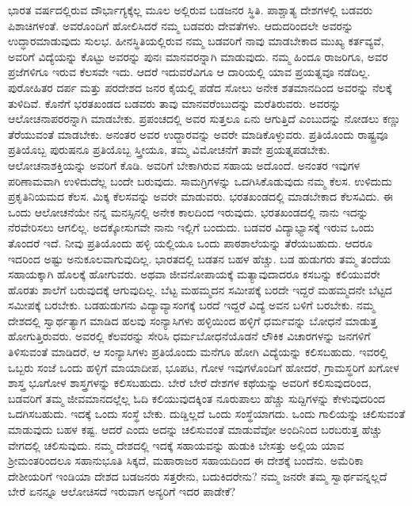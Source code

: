 ಭಾರತ ವರ್ಷದಲ್ಲಿರುವ ದೌರ್ಭಾಗ್ಯಕ್ಕೆಲ್ಲ ಮೂಲ ಅಲ್ಲಿರುವ ಬಡಜನರ ಸ್ಥಿತಿ. ಪಾಶ್ಚಾತ್ಯ ದೇಶಗಳಲ್ಲಿ ಬಡವರು ಪಿಶಾಚಿಗಳಂತೆ. ಅವರೊಂದಿಗೆ ಹೋಲಿಸಿದರೆ ನಮ್ಮ ಬಡವರು ದೇವತೆಗಳು. ಆದುದರಿಂದಲೇ ಅವರನ್ನು ಉದ್ಧಾರಮಾಡುವುದು ಸುಲಭ. ಹೀನಸ್ಥಿತಿಯಲ್ಲಿರುವ ನಮ್ಮ ಬಡವರಿಗೆ ನಾವು ಮಾಡಬೇಕಾದ ಮುಖ್ಯ ಕರ್ತವ್ಯವೆ, ಅವರಿಗೆ ವಿದ್ಯೆಯನ್ನು ಕೊಟ್ಟು ಅವರನ್ನು ಪುನಃ ಮಾನವರನ್ನಾಗಿ ಮಾಡುವುದು. ನಮ್ಮ ಹಿಂದೂ ರಾಜರಿಗೂ, ಅವರ ಪ್ರಜೆಗಳಿಗೂ ಇರುವ ಕೆಲಸವೇ ಇದು. ಆದರೆ ಇದುವರೆವಿಗೂ ಆ ದಾರಿಯಲ್ಲಿ ಯಾವ ಪ್ರಯತ್ನವೂ ನಡೆದಿಲ್ಲ. ಪುರೋಹಿತರ ದರ್ಪ ಮತ್ತು ಪರದೇಶದ ಜನರ ಕೈಯಲ್ಲಿ ಪಡೆದ ಸೋಲು ಅನೇಕ ಶತಮಾನದಿಂದ ಅವರನ್ನು ನೆಲಕ್ಕೆ ತುಳಿದಿವೆ. ಕೊನೆಗೆ ಭರತಖಂಡದ ಬಡವರು ತಾವು ಮಾನವರೆಂಬುದನ್ನು ಮರೆತಿರುವರು. ಅವರನ್ನು ಆಲೋಚನಾಪರರನ್ನಾಗಿ ಮಾಡಬೇಕು. ಪ್ರಪಂಚದಲ್ಲಿ ಅವರ ಸುತ್ತಲೂ ಏನು ಆಗುತ್ತಿದೆ ಎಂಬುದನ್ನು ನೋಡಲು ಕಣ್ಣು ತೆರೆಯುವಂತೆ ಮಾಡಬೇಕು. ಅನಂತರ ಅವರ ಉದ್ದಾರವನ್ನು ಅವರೇ ಮಾಡಿಕೊಳ್ಳುವರು. ಪ್ರತಿಯೊಂದು ರಾಷ್ಟ್ರವೂ ಪ್ರತಿಯೊಬ್ಬ ಪುರುಷನೂ ಪ್ರತಿಯೊಬ್ಬ ಸ್ತ್ರೀಯೂ, ತಮ್ಮ ವಿಮೋಚನೆಗೆ ತಾವೇ ಪ್ರಯತ್ನಪಡಬೇಕು. ಆಲೋಚನಾಶಕ್ತಿಯನ್ನು ಅವರಿಗೆ ಕೊಡಿ. ಅವರಿಗೆ ಬೇಕಾಗಿರುವ ಸಹಾಯ ಅದೊಂದೆ. ಅನಂತರ ಇವುಗಳ ಪರಿಣಾಮವಾಗಿ ಉಳಿದುದೆಲ್ಲ ಬಂದೇ ಬರುವುದು. ಸಾಮಗ್ರಿಗಳನ್ನು ಒದಗಿಸಿಕೊಡುವುದು ನಮ್ಮ ಕೆಲಸ. ಉಳಿದುದು ಪ್ರಕೃತಿನಿಯಮದ ಕೆಲಸ. ಮಿಕ್ಕ ಕೆಲಸವನ್ನು ಅವರೇ ಮಾಡುವರು. ಭರತಖಂಡದಲ್ಲಿ ಮಾಡಬೇಕಾದ ಕೆಲಸವಿದು. ಈ ಒಂದು ಆಲೋಚನೆಯೇ ನನ್ನ ಮನಸ್ಸಿನಲ್ಲಿ ಅನೇಕ ಕಾಲದಿಂದ ಇರುವುದು. ಭರತಖಂಡದಲ್ಲಿ ನಾನು ಇದನ್ನು ನೆರವೇರಿಸಲು ಆಗಲಿಲ್ಲ. ಅದಕ್ಕೋಸುಗವೇ ನಾನು ಇಲ್ಲಿಗೆ ಬಂದುದು. ಬಡವರ ವಿದ್ಯಾಭ್ಯಾಸಕ್ಕೆ ಇರುವ ಒಂದು ತೊಂದರೆ ಇದೆ. ನೀವು ಪ್ರತಿಯೊಂದು ಹಳ್ಳಿ ಯಲ್ಲಿಯೂ ಒಂದು ಪಾಠಶಾಲೆಯನ್ನು ತೆರೆಯಬಹುದು. ಆದರೂ ಇದರಿಂದ ಅಷ್ಟು ಅನುಕೂಲವಾಗುವುದಿಲ್ಲ. ಭಾರತದಲ್ಲಿ ಬಡತನ ಬಹಳ ಹೆಚ್ಚು. ಬಡ ಹುಡುಗರು ತಮ್ಮ ತಂದೆಯ ಸಹಾಯಕ್ಕಾಗಿ ಹೊಲಕ್ಕೆ ಹೋಗುವರು. ಅಥವಾ ಜೀವನೋಪಾಯಕ್ಕೆ ಮತ್ಯಾವುದಾದರೂ ಕಸಬನ್ನು ಕಲಿಯುವರೇ ಹೊರತು ಶಾಲೆಗೆ ಬರುವುದಕ್ಕೆ ಆಗುವುದಿಲ್ಲ. ಬೆಟ್ಟ ಮಹಮ್ಮದನ ಸಮೀಪಕ್ಕೆ ಬರದೇ ಇದ್ದರೆ ಮಹಮ್ಮದನೇ ಬೆಟ್ಟದ ಸಮೀಪಕ್ಕೆ ಬರಬೇಕು. ಬಡಹುಡುಗನು ವಿದ್ಯಾವ್ಯಾಸಂಗಕ್ಕೆ ಬರದೆ ಇದ್ದರೆ ವಿದ್ಯೆ ಅವನ ಬಳಿಗೆ ಬರಬೇಕು. ನಮ್ಮ ದೇಶದಲ್ಲಿ ಸ್ವಾರ್ಥತ್ಯಾಗ ಮಾಡಿದ ಹಲವು ಸಂನ್ಯಾಸಿಗಳು ಹಳ್ಳಿಯಿಂದ ಹಳ್ಳಿಗೆ ಧರ್ಮವನ್ನು ಬೋಧನೆ ಮಾಡುತ್ತ ಹೋಗುತ್ತಿರುವರು. ಅವರಲ್ಲಿ ಕೆಲವರನ್ನು ಸೇರಿಸಿ ಧರ್ಮಬೋಧನೆಯೊಡನೆ ಲೌಕಿಕ ವಿಚಾರಗಳನ್ನು ಜನಗಳಿಗೆ ತಿಳಿಸುವಂತೆ ಮಾಡಿದರೆ, ಆ ಸಂನ್ಯಾಸಿಗಳು ಪ್ರತಿಯೊಂದು ಮನೆಗೂ ಹೋಗಿ ವಿದ್ಯೆಯನ್ನು ಕಲಿಸಬಹುದು. ಇವರಲ್ಲಿ ಒಬ್ಬರು ಸಂಜೆ ಒಂದು ಹಳ್ಳಿಗೆ ಮಾಯಾದೀಪ, ಭೂಪಟ, ಗೋಳ ಇವುಗಳೊಂದಿಗೆ ಹೋದರೆ, ಗ್ರಾಮಸ್ಥರಿಗೆ ಖಗೋಳ ಶಾಸ್ತ್ರ ಭೂಗೋಳ ಶಾಸ್ತ್ರಗಳನ್ನು ಕಲಿಸಬಹುದು. ಬೇರೆ ಬೇರೆ ದೇಶಗಳ ಕಥೆಯನ್ನು ಅವರಿಗೆ ಕಲಿಸುವುದರಿಂದ, ಬಡವರಿಗೆ ತಮ್ಮ ಜೀವಮಾನದಲ್ಲೆಲ್ಲ ಓದಿ ಕಲಿಯುವುದಕ್ಕಿಂತ ನೂರುಪಾಲು ಹೆಚ್ಚು ಸುದ್ದಿಗಳನ್ನು ಕೇಳುವುದರಿಂದ ಒದಗಿಸಬಹುದು. ಇದಕ್ಕೆ ಒಂದು ಸಂಸ್ಥೆ ಬೇಕು. ದುಡ್ಡಿಲ್ಲದೆ ಒಂದು ಸಂಸ್ಥೆಯಾಗದು. ಒಂದು ಗಾಲಿಯನ್ನು ಚಲಿಸುವಂತೆ ಮಾಡುವುದು ಬಹಳ ಕಷ್ಟ. ಆದರೆ ಎಂದು ಅದನ್ನು ಚಲಿಸುವಂತೆ ಮಾಡುವೆವೋ ಅಂದಿನಿಂದ ಬರಬರುತ್ತ ಹೆಚ್ಚು ವೇಗದಲ್ಲಿ ಚಲಿಸುವುದು. ನಮ್ಮ ದೇಶದಲ್ಲಿ ಇದಕ್ಕೆ ಸಹಾಯವನ್ನು ಹುಡುಕಿ ಬೇಸತ್ತು ಅಲ್ಲಿಯ ಯಾವ ಶ‍್ರೀಮಂತರಿಂದಲೂ ಸಹಾನುಭೂತಿ ಸಿಕ್ಕದೆ, ಮಹಾರಾಜರ ಸಹಾಯದಿಂದ ಈ ದೇಶಕ್ಕೆ ಬಂದೆನು. ಅಮೆರಿಕಾ ದೇಶೀಯರಿಗೆ ಇಂಡಿಯಾ ದೇಶದ ಬಡಜನರು ಸತ್ತರೇನು, ಬದುಕಿದರೇನು? ನಮ್ಮ ಜನರೇ ತಮ್ಮ ಸ್ವಾರ್ಥವನ್ನಲ್ಲದೆ ಬೇರೆ ಏನನ್ನೂ ಆಲೋಚಿಸದೆ ಇರುವಾಗ ಅನ್ಯರಿಗೆ ಇದರ ಪಾಡೇಕೆ?

